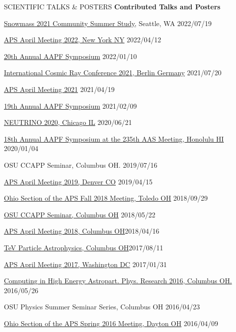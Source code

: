 \documentclass{resume} %
\begin{document}
\begin{rSection}{SCIENTIFIC TALKS \& POSTERS}
{\bf Contributed Talks and Posters}
\begin{etaremune}
\setlength\itemsep{-0.5em}
\item \href{https://indico.fnal.gov/event/22303/contributions/245833/}{Snowmass 2021 Community Summer Study}, Seattle, WA  \hfill 2022/07/19
\item \href{https://meetings.aps.org/Meeting/APR22/Session/Y09.1}{APS April Meeting 2022, New York NY} \hfill 2022/04/12
\item \href{https://aapf-fellows.org/symposium/2022}{20th Annual AAPF Symposium} \hfill 2022/01/10
\item \href{https://indico.desy.de/event/27991/contributions/102162/}{International Cosmic Ray Conference 2021, Berlin Germany} \hfill 2021/07/20
\item \href{http://meetings.aps.org/Meeting/APR21/Session/T18}{APS April Meeting 2021} \hfill 2021/04/19
\item \href{https://sites.google.com/view/aapf2021/schedule}{19th Annual AAPF Symposium} \hfill 2021/02/09
\item \href{https://indico.fnal.gov/event/19348/contributions/186681/}{NEUTRINO 2020, Chicago IL} \hfill 2020/06/21
\item \href{https://aapf-fellows.org/symposium/2020#BrianClark}{18th Annual AAPF Symposium at the 235th AAS Meeting, Honolulu HI} \hfill 2020/01/04
\item OSU CCAPP Seminar, Columbus OH. \hfill 2019/07/16
\item \href{http://meetings.aps.org/Meeting/APR19/Session/R08.4}{APS April Meeting 2019, Denver CO} \hfill 2019/04/15
\item \href{http://meetings.aps.org/Meeting/OSF18/Session/A01.2}{Ohio Section of the APS Fall 2018 Meeting, Toledo OH} \hfill 2018/09/29
\item \href{http://ccapp.osu.edu/pastseminars.html#past}{OSU CCAPP Seminar, Columbus OH} \hfill 2018/05/22
\item \href{http://meetings.aps.org/Meeting/APR18/Session/U17.7}{APS April Meeting 2018, Columbus OH}\hfill 2018/04/16
\item \href{http://indico.cern.ch/event/615891/contributions/2648790/}{TeV Particle Astrophysics, Columbus OH}\hfill 2017/08/11
\item \href{http://meetings.aps.org/Meeting/APR17/Session/Y3.2}{APS April Meeting 2017, Washington DC} \hfill 2017/01/31
\item \href{http://ccapp.osu.edu/workshops/CHEAPR2016/workshop.html}{Computing in High Energy Astropart. Phys. Research 2016, Columbus OH.} \hfill 2016/05/26
\item OSU Physics Summer Seminar Series, Columbus OH \hfill 2016/04/23
\item \href{http://meetings.aps.org/Meeting/OSS16/Session/D3.6}{Ohio Section of the APS Spring 2016 Meeting, Dayton OH} \hfill 2016/04/09

\end{etaremune}
\end{rSection}
\newpage
\end{document}
